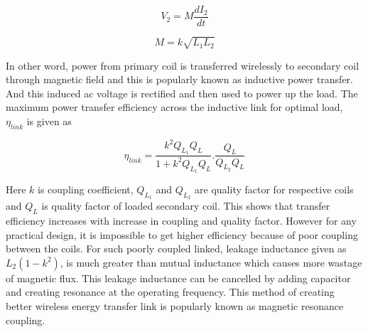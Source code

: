 \documentclass[UKenglish]{ifimaster}  %
\begin{document}
\begin{equation} \label{eq:induced_v} %
V_{2} = M\frac{dI_{2}}{dt}
\end{equation}

\begin{equation} \label{eq:mutual_ind} %
 M =k{\sqrt{L_{1}L_{2}}}
\end{equation}

In other word, power from primary coil is transferred wirelessly to secondary coil through magnetic field and this is popularly known as inductive power transfer. And this 
induced ac voltage is rectified and then used to power up the load.
The maximum power transfer efficiency across the inductive link for optimal load, $\eta_{link}$ is given as  \cite{ant_PSC_geometry}

\begin{equation} \label{eq:effi_link}	%
\eta_{link} = \frac{k^2Q_{L_{1}} Q_{L}} {  1 + k^2Q_{L_{1}} Q_{L} } . \frac{Q_{L}}{Q_{L_{2}}Q_{L}} %
\end{equation} 

Here $k$ is coupling coefficient, $Q_{L_{1}}$ and $Q_{L_{2}}$ are quality factor for respective coils  and $Q_{L}$ is quality factor of loaded secondary coil. This shows that transfer 
efficiency increases with increase in coupling and quality factor. However for any practical design, it is impossible to get higher efficiency because of poor coupling between the coils. For such poorly coupled linked, leakage inductance given as $L_{2}(1-k^2)$, is much greater than mutual inductance\cite{koen_robert_2009} which causes more wastage of magnetic flux. This leakage 
inductance can be cancelled by adding capacitor and creating resonance at the operating frequency.  This method of creating better wireless 
energy transfer link is popularly known as magnetic resonance coupling. \\ 

\end{document}
